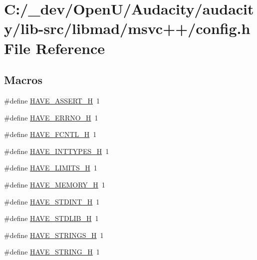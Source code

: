 \hypertarget{lib-src_2libmad_2msvc_09_09_2config_8h}{}\section{C\+:/\+\_\+dev/\+Open\+U/\+Audacity/audacity/lib-\/src/libmad/msvc++/config.h File Reference}
\label{lib-src_2libmad_2msvc_09_09_2config_8h}
\subsection*{Macros}
\begin{DoxyCompactItemize}
\item 
\#define \hyperlink{lib-src_2libmad_2msvc_09_09_2config_8h_ad0eabe2e5407bc73450eb15b657983cd}{H\+A\+V\+E\+\_\+\+A\+S\+S\+E\+R\+T\+\_\+H}~1
\item 
\#define \hyperlink{lib-src_2libmad_2msvc_09_09_2config_8h_ae655a511fd230d2fd6b99ff2801df201}{H\+A\+V\+E\+\_\+\+E\+R\+R\+N\+O\+\_\+H}~1
\item 
\#define \hyperlink{lib-src_2libmad_2msvc_09_09_2config_8h_a765d75020849aa0a9b6becd9a5b7a193}{H\+A\+V\+E\+\_\+\+F\+C\+N\+T\+L\+\_\+H}~1
\item 
\#define \hyperlink{lib-src_2libmad_2msvc_09_09_2config_8h_ab90a030ff2790ebdc176660a6dd2a478}{H\+A\+V\+E\+\_\+\+I\+N\+T\+T\+Y\+P\+E\+S\+\_\+H}~1
\item 
\#define \hyperlink{lib-src_2libmad_2msvc_09_09_2config_8h_ac70f0930238c8d095d7cc2ee8b522c77}{H\+A\+V\+E\+\_\+\+L\+I\+M\+I\+T\+S\+\_\+H}~1
\item 
\#define \hyperlink{lib-src_2libmad_2msvc_09_09_2config_8h_ae93a78f9d076138897af441c9f86f285}{H\+A\+V\+E\+\_\+\+M\+E\+M\+O\+R\+Y\+\_\+H}~1
\item 
\#define \hyperlink{lib-src_2libmad_2msvc_09_09_2config_8h_ab6cd6d1c63c1e26ea2d4537b77148354}{H\+A\+V\+E\+\_\+\+S\+T\+D\+I\+N\+T\+\_\+H}~1
\item 
\#define \hyperlink{lib-src_2libmad_2msvc_09_09_2config_8h_a9e0e434ec1a6ddbd97db12b5a32905e0}{H\+A\+V\+E\+\_\+\+S\+T\+D\+L\+I\+B\+\_\+H}~1
\item 
\#define \hyperlink{lib-src_2libmad_2msvc_09_09_2config_8h_a405d10d46190bcb0320524c54eafc850}{H\+A\+V\+E\+\_\+\+S\+T\+R\+I\+N\+G\+S\+\_\+H}~1
\item 
\#define \hyperlink{lib-src_2libmad_2msvc_09_09_2config_8h_ad4c234dd1625255dc626a15886306e7d}{H\+A\+V\+E\+\_\+\+S\+T\+R\+I\+N\+G\+\_\+H}~1

\end{DoxyCompactItemize}
